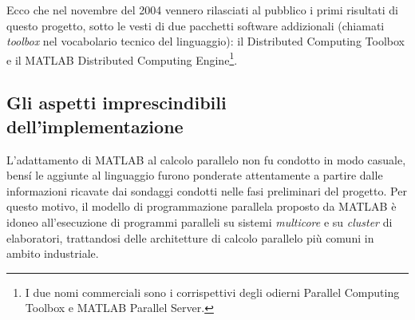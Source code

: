 Ecco che nel novembre del 2004 vennero rilasciati al pubblico i primi risultati di questo progetto, sotto le vesti di due pacchetti software addizionali (chiamati \textit{toolbox} nel vocabolario tecnico del linguaggio): il Distributed Computing 
Toolbox\textsuperscript{\texttrademark} e il MATLAB Distributed Computing Engine\textsuperscript{\texttrademark}\footnote{I due nomi commerciali sono i corrispettivi degli odierni Parallel 
Computing Toolbox\textsuperscript{\texttrademark} e MATLAB Parallel Server\textsuperscript{\texttrademark}.}.

\subsection{Gli aspetti imprescindibili dell'implementazione}
\label{sec2.1.2}
L'adattamento di MATLAB al calcolo parallelo non fu condotto in modo casuale, bens\'i le aggiunte al linguaggio furono ponderate attentamente a partire dalle informazioni ricavate dai sondaggi condotti nelle fasi preliminari del progetto.\newline
Per questo motivo, il modello di programmazione parallela proposto da MATLAB \`e idoneo all'esecuzione di programmi paralleli su sistemi \textit{multicore} e su \textit{cluster} di elaboratori, trattandosi delle architetture di calcolo parallelo pi\`u comuni in ambito industriale.

